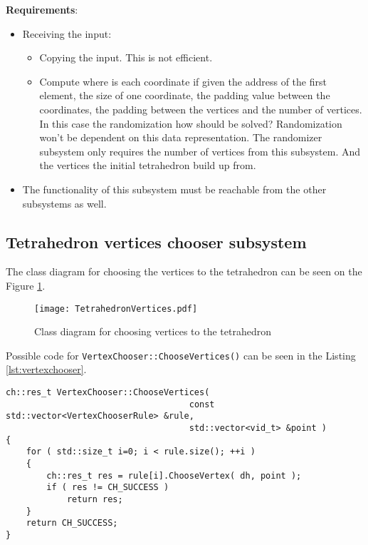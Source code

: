 \textbf{Requirements}:

\begin{itemize}
	\item	Receiving the input:
		\begin{itemize}
			\item	Copying the input. This is not efficient.
			\item	Compute where is each coordinate if given the address of the
						first element, the size of one coordinate, the padding
						value between the coordinates, the padding between
						the vertices and the number of vertices.
						In this case the randomization how should be solved?
						Randomization won't be dependent on this data
						representation. The randomizer subsystem only requires
						the number of vertices from this subsystem. And the
						vertices the initial tetrahedron build up from.
		\end{itemize}
	\item	The functionality of this subsystem must be reachable from the other
		subsystems as well.
\end{itemize}



\subsection{Tetrahedron vertices chooser subsystem}

The class diagram for choosing the vertices to the tetrahedron can be seen on
the Figure \ref{fig:tetrahedronvertices}.

\begin{figure}[h]
	\centering
	\texttt{[image: TetrahedronVertices.pdf]}
	\caption{Class diagram for choosing vertices to the tetrahedron}
	\label{fig:tetrahedronvertices}
\end{figure}


Possible code for \texttt{VertexChooser::ChooseVertices()}  can be seen in
the Listing \ref{lst:vertexchooser}.

\begin{lstlisting}[caption={Possible code for the
							\texttt{VertexChooser::ChooseVertices()} function},
					label={lst:vertexchooser}]
ch::res_t VertexChooser::ChooseVertices(
									const std::vector<VertexChooserRule> &rule,
									std::vector<vid_t> &point )
{
	for ( std::size_t i=0; i < rule.size(); ++i )
	{
		ch::res_t res = rule[i].ChooseVertex( dh, point );
		if ( res != CH_SUCCESS )
			return res;
	}
	return CH_SUCCESS;
}
\end{lstlisting}


